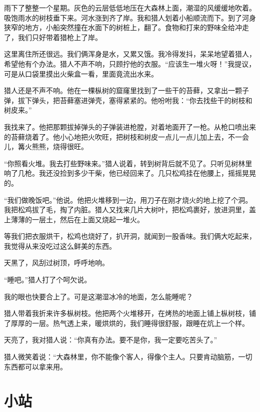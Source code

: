 \documentclass[12pt,UTF-8,openany]{ctexbook}
\begin{document}
\begin{large}
    
    雨下了整整一个星期。灰色的云层低低地压在大森林上面，潮湿的风缓缓地吹着。吸饱雨水的树枝垂下来。河水涨到齐了岸。我和猎人划着小船顺流而下。到了河身狭窄的地方，小船突然撞在水面下的树桩上，翻了。食物和打来的野味全给冲走了，我们只好带着猎枪上了岸。
    
    这里离住所还很远。我们俩浑身是水，又累又饿。我冷得发抖，呆呆地望着猎人，希望他有个办法。猎人不声不响，只顾拧他的衣服。“应该生一堆火呀！”我提议，可是从口袋里摸出火柴盒一看，里面竟流出水来。
    
    猎人还是不声不响。他在一棵枞树的窟窿里找到了一些干的苔藓，又拿出一颗子弹，拔下弹头，把苔藓塞进弹壳，塞得紧紧的。他吩咐我：“你去找些干的树枝和树皮来。”
    
    我找来了。他把那颗拔掉弹头的子弹装进枪膛，对着地面开了一枪。从枪口喷出来的苔藓烧着了。他小心地把火吹旺，把树枝和树皮一点儿一点儿加上去，不一会儿，篝火熊熊，烧得很旺。
    
    “你照看火堆。我去打些野味来。”猎人说着，转到树背后就不见了。只听见树林里响了几枪。我还没捡到多少干柴，他已经回来了。几只松鸡挂在他腰上，摇摇晃晃的。
    
    “我们做晚饭吧。”他说。他把火堆移到一边，用刀子在刚才烧火的地上挖了个洞。我把松鸡拔了毛，掏了内脏。猎人又找来几片大树叶，把松鸡裹好，放进洞里，盖上薄薄的一层土，然后在上面又烧起一堆火。
    
    等我们把衣服烘干，松鸡也烧好了，扒开洞，就闻到一股香味。我们俩大吃起来，我觉得从来没吃过这么鲜美的东西。
    
    天黑了，风刮过树顶，呼呼地响。
    
    “睡吧。”猎人打了个呵欠说。
    
    我的眼也快要合上了。可是这潮湿冰冷的地面，怎么能睡呢？
    
    猎人带着我折来许多枞树枝。他把两个火堆移开，在烤热的地面上铺上枞树枝，铺了厚厚的一层。热气透上来，暖烘烘的，我们睡得很舒服，跟睡在炕上一个样。
    
    天亮了，我对猎人说：“你真有办法。要不是你，我一定要吃苦头了。”
    
    猎人微笑着说：“大森林里，你不能像个客人，得像个主人。只要肯动脑筋，一切东西都可以拿来用。
    
\end{large}



\chapter{小站}
\end{document}
